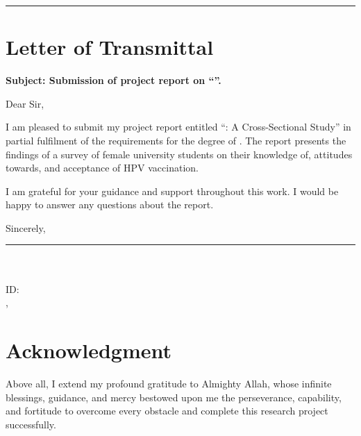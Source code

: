 \vfill
\noindent\rule{\textwidth}{0.5pt}
\clearpage

\chapter*{Letter of Transmittal}
\submissionmonth\par
\supervisorname\par
\supervisortitle\par
\institution\par
\institutionaddress\par

\textbf{Subject: Submission of project report on ``\thesistitle''.}

Dear Sir,

I am pleased to submit my project report entitled ``\thesistitle: A Cross-Sectional Study'' in partial fulfilment of the requirements for the degree of \degreename. The report presents the findings of a survey of female university students on their knowledge of, attitudes towards, and acceptance of HPV vaccination.

I am grateful for your guidance and support throughout this work. I would be happy to answer any questions about the report.

Sincerely,

\vspace{30pt}
\noindent
\begin{minipage}[t]{0.48\textwidth}
\end{minipage}\hfill
\begin{minipage}[t]{0.48\textwidth}
\centering
\rule{6cm}{0.4pt}\\
\textbf{\authorname}\\
ID: \authorid\\
\departmentname, \institution
\end{minipage}
\clearpage

\chapter*{Acknowledgment}
Above all, I extend my profound gratitude to Almighty Allah, whose infinite blessings, guidance, and mercy bestowed upon me the perseverance, capability, and fortitude to overcome every obstacle and complete this research project successfully.

